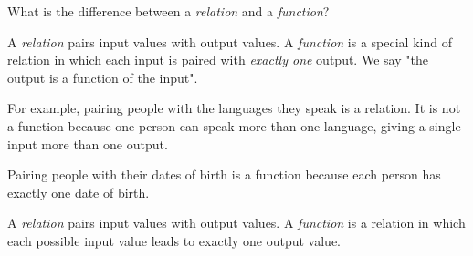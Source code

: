 \documentclass[a4paper,11pt]{article}
\begin{document}
\maketitle

\begin{problem}
What is the difference between a \emph{relation} and a \emph{function}?
\end{problem}

\begin{solution}
A \emph{relation} pairs input values with output values.
A \emph{function} is a special kind of relation in which each input is paired with \emph{exactly one} output. We say "the output is a function of the input".

For example, pairing people with the languages they speak is a relation. It is not a function because one person can speak more than one language, giving a single input more than one output.

Pairing people with their dates of birth is a function because each person has exactly one date of birth.
\end{solution}

\begin{answer}
A \emph{relation} pairs input values with output values.
A \emph{function} is a relation in which each possible input value leads to exactly one output value.
\end{answer}
\end{document}
